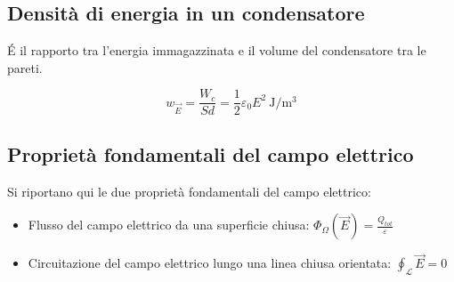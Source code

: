 \subsection{Densità di energia in un condensatore}

É il rapporto tra l'energia immagazzinata e il volume del condensatore tra le pareti.

\begin{equation*}
    w_{\vec{E}} = \frac{W_c}{Sd} = \frac{1}{2} \varepsilon_0 E^2 \SI{}{\joule\per\meter\cubed}
\end{equation*}

\subsection{Proprietà fondamentali del campo elettrico}

Si riportano qui le due proprietà fondamentali del campo elettrico:

\begin{itemize}
    \item Flusso del campo elettrico da una superficie chiusa: $\Phi_\Omega(\vec{E}) = \frac{Q_{tot}}{\varepsilon}$
    \item Circuitazione del campo elettrico lungo una linea chiusa orientata: $\oint_\mathcal{L} \vec{E} = 0$
\end{itemize}






















